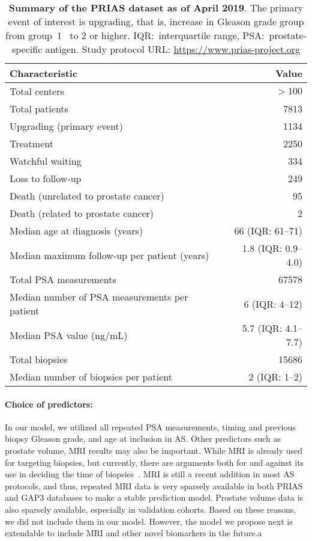 \begin{table}
\small\sf\centering
\caption{\textbf{Summary of the PRIAS dataset as of April 2019}. The primary event of interest is upgrading, that is, increase in Gleason grade group from group~1~\citep{epsteinGG2014} to 2 or higher. IQR:~interquartile range, PSA:~prostate-specific antigen. Study protocol URL: \url{https://www.prias-project.org}}
\label{table:prias_summary}
\begin{tabular}{lr}
\toprule
\textbf{Characteristic} & \textbf{Value}\\
\midrule
Total centers & $> 100$\\
Total patients & 7813\\
Upgrading (primary event) & 1134\\
Treatment & 2250\\
Watchful waiting & 334\\
Loss to follow-up & 249\\
Death (unrelated to prostate cancer) & 95\\
Death (related to prostate cancer) & 2\\
\midrule
Median age at diagnosis (years) & 66 (IQR: 61--71)\\
Median maximum follow-up per patient (years) &  1.8 (IQR: 0.9--4.0)\\
Total PSA measurements & 67578\\
Median number of PSA measurements per patient &  6 (IQR: 4--12)\\
Median PSA value (ng/mL) & 5.7 (IQR: 4.1--7.7)\\
Total biopsies & 15686\\
Median number of biopsies per patient &  2 (IQR: 1--2)\\
\bottomrule
\end{tabular}
\end{table}

\paragraph{Choice of predictors:} In our model, we utilized all repeated PSA measurements, timing and previous biopsy Gleason grade, and age at inclusion in AS. Other predictors such as prostate volume, MRI results may also be important. While MRI is already used for targeting biopsies, but currently, there are arguments both for and against its use in deciding the time of biopsies~\citep{kasivisvanathan2020magnetic,chesnut2019role,schoots2015magnetic}. MRI is still a recent addition in most AS protocols, and thus, repeated MRI data is very sparsely available in both PRIAS and GAP3 databases to make a stable prediction model. Prostate volume data is also sparsely available, especially in validation cohorts. Based on these reasons, we did not include them in our model. However, the model we propose next is extendable to include MRI and other novel biomarkers in the future.a